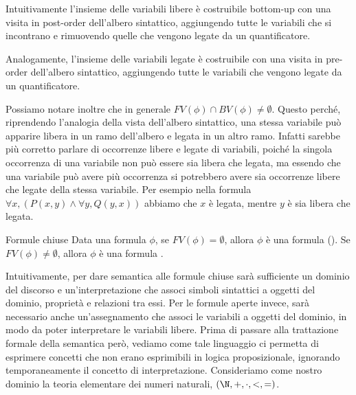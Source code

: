 Intuitivamente l'insieme delle variabili libere è costruibile bottom-up con una visita in post-order dell'albero sintattico, aggiungendo tutte le variabili che si incontrano e rimuovendo quelle che vengono legate da un quantificatore. 

Analogamente, l'insieme delle variabili legate è costruibile con una visita in pre-order dell'albero sintattico, aggiungendo tutte le variabili che vengono legate da un quantificatore.

Possiamo notare inoltre che in generale \(FV(\phi)\cap BV(\phi)\neq\emptyset\). Questo perché, riprendendo l'analogia della vista dell'albero sintattico, una stessa variabile può apparire libera in un ramo dell'albero e legata in un altro ramo. Infatti sarebbe più corretto parlare di occorrenze libere e legate di variabili, poiché la singola occorrenza di una variabile non può essere sia libera che legata, ma essendo che una variabile può avere più occorrenza si potrebbero avere sia occorrenze libere che legate della stessa variabile. Per esempio nella formula \(\forall x,(P(x,y)\land \forall y, Q(y,x))\) abbiamo che \(x\) è legata, mentre \(y\) è sia libera che legata.

\begin{definition}{Formule chiuse}
  Data una formula \(\phi\), se \(FV(\phi)=\emptyset\), allora \(\phi\) è una formula  ().
  Se \(FV(\phi)\neq\emptyset\), allora \(\phi\) è una formula .
\end{definition}

Intuitivamente, per dare semantica alle formule chiuse sarà sufficiente un dominio del discorso e un'interpretazione che associ simboli sintattici a oggetti del dominio, proprietà e relazioni tra essi. Per le formule aperte invece, sarà necessario anche un'assegnamento che associ le variabili a oggetti del dominio, in modo da poter interpretare le variabili libere. Prima di passare alla trattazione formale della semantica però, vediamo come tale linguaggio ci permetta di esprimere concetti che non erano esprimibili in logica proposizionale, ignorando temporaneamente il concetto di interpretazione. Consideriamo come nostro dominio la teoria elementare dei numeri naturali, \((\N,+,\cdot,<,=)\).

